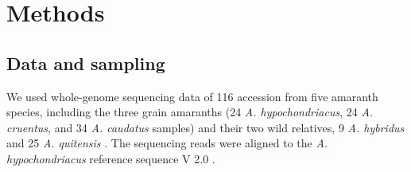 \documentclass[9pt,twocolumn,twoside]{celabRxiv}
\begin{document}


 

 


\section{Methods}
\subsection{Data and sampling}
 
We used whole-genome sequencing data of 116 accession from five amaranth species, including the three grain amaranths (24 \textit{A. hypochondriacus}, 24 \textit{A. cruentus}, and 34 \textit{A. caudatus} samples) and their two wild relatives, 9 \textit{A. hybridus} and 25 \textit{A. quitensis} \citep{stetter2020parallel}. 
The sequencing reads were aligned to the \textit{A. hypochondriacus} reference sequence V 2.0 \citep{lightfoot2017single}.
\end{document}
